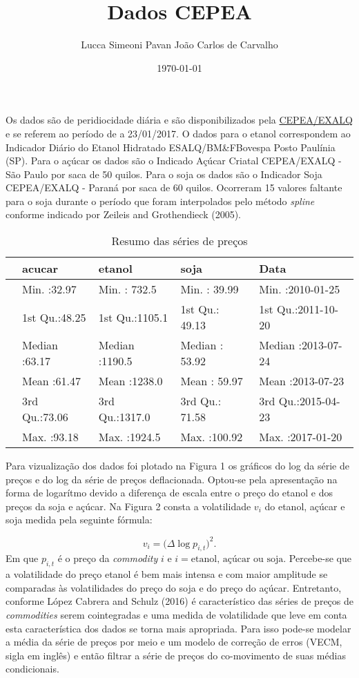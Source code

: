 \documentclass[]{article}
\title{Dados CEPEA}
\author{Lucca Simeoni Pavan \hspace{1cm} João Carlos de Carvalho}
\date{\today}
\begin{document}
\maketitle

Os dados são de peridiocidade diária e são disponibilizados pela
\href{http://www.cepea.esalq.usp.br/br/consultas-ao-banco-de-dados-do-site.aspx}{CEPEA/EXALQ}
e se referem ao período de a 23/01/2017. O dados para o etanol
correspondem ao Indicador Diário do Etanol Hidratado ESALQ/BM\&FBovespa
Posto Paulínia (SP). Para o açúcar os dados são o Indicado Açúcar
Criatal CEPEA/EXALQ - São Paulo por saca de 50 quilos. Para o soja os
dados são o Indicador Soja CEPEA/EXALQ - Paraná por saca de 60 quilos.
Ocorreram 15 valores faltante para o soja durante o período que foram
interpolados pelo método \emph{spline} conforme indicado por Zeileis and
Grothendieck (2005).

\begin{longtable}[t]{lllll}
\caption{\label{tab:unnamed-chunk-5}Resumo das séries de preços}\\
\toprule
  &     acucar &     etanol &      soja &      Data\\
\midrule
 & Min.   :32.97 & Min.   : 732.5 & Min.   : 39.99 & Min.   :2010-01-25\\
 & 1st Qu.:48.25 & 1st Qu.:1105.1 & 1st Qu.: 49.13 & 1st Qu.:2011-10-20\\
 & Median :63.17 & Median :1190.5 & Median : 53.92 & Median :2013-07-24\\
 & Mean   :61.47 & Mean   :1238.0 & Mean   : 59.97 & Mean   :2013-07-23\\
 & 3rd Qu.:73.06 & 3rd Qu.:1317.0 & 3rd Qu.: 71.58 & 3rd Qu.:2015-04-23\\
 & Max.   :93.18 & Max.   :1924.5 & Max.   :100.92 & Max.   :2017-01-20\\
\bottomrule
\end{longtable}

Para vizualização dos dados foi plotado na Figura 1 os gráficos do log
da série de preços e do log da série de preços deflacionada. Optou-se
pela apresentação na forma de logarítmo devido a diferença de escala
entre o preço do etanol e dos preços da soja e açúcar. Na Figura 2
consta a volatilidade \(v_i\) do etanol, açúcar e soja medida pela
seguinte fórmula:

\[v_i = \bigg(\Delta \log p_{i,t}\bigg)^2.\] Em que \(p_{i,t}\) é o
preço da \emph{commodity} \(i\) e \(i = \text{etanol, açúcar ou soja}\).
Percebe-se que a volatilidade do preço etanol é bem mais intensa e com
maior amplitude se comparadas às volatilidades do preço do soja e do
preço do açúcar. Entretanto, conforme López Cabrera and Schulz (2016) é
característico das séries de preços de \emph{commodities} serem
cointegradas e uma medida de volatilidade que leve em conta esta
característica dos dados se torna mais apropriada. Para isso pode-se
modelar a média da série de preços por meio e um modelo de correção de
erros (VECM, sigla em inglês) e então filtrar a série de preços do
co-movimento de suas médias condicionais.
\end{document}
